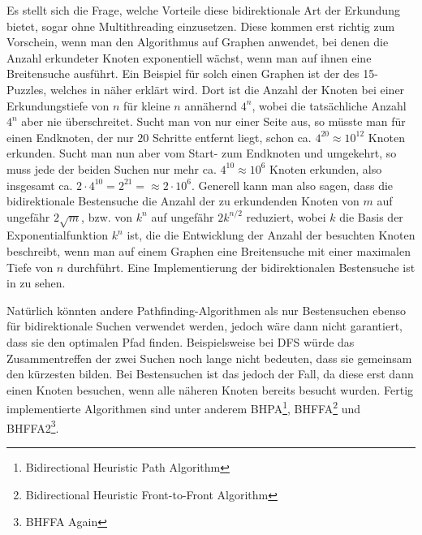             Es stellt sich die Frage, welche Vorteile diese bidirektionale Art der Erkundung bietet, sogar ohne Multithreading einzusetzen. Diese kommen erst richtig zum Vorschein, wenn man den Algorithmus auf Graphen anwendet, bei denen die Anzahl erkundeter Knoten exponentiell wächst, wenn man auf ihnen eine Breitensuche ausführt. Ein Beispiel für solch einen Graphen ist der des 15-Puzzles, welches in  näher erklärt wird. Dort ist die Anzahl der Knoten bei einer Erkundungstiefe von $n$ für kleine $n$ annähernd $4^n$, wobei die tatsächliche Anzahl $4^n$ aber nie überschreitet. Sucht man von nur einer Seite aus, so müsste man für einen Endknoten, der nur $20$ Schritte entfernt liegt, schon ca. $4^{20} \approx 10^{12}$ Knoten erkunden. Sucht man nun aber vom Start- zum Endknoten und umgekehrt, so muss jede der beiden Suchen nur mehr ca. $4^{10} \approx 10^6$ Knoten erkunden, also insgesamt ca. $2 \cdot 4^{10} = 2^{21} = \approx 2 \cdot 10^6$. Generell kann man also sagen, dass die bidirektionale Bestensuche die Anzahl der zu erkundenden Knoten von $m$ auf ungefähr $2 \sqrt{m}$, bzw. von $k^n$ auf ungefähr $2k^{n/2}$ reduziert, wobei $k$ die Basis der Exponentialfunktion $k^n$ ist, die die Entwicklung der Anzahl der besuchten Knoten beschreibt, wenn man auf einem Graphen eine Breitensuche mit einer maximalen Tiefe von $n$ durchführt. Eine Implementierung der bidirektionalen Bestensuche ist in  zu sehen.

            Natürlich könnten andere Pathfinding-Algorithmen als nur Bestensuchen ebenso für bidirektionale Suchen verwendet werden, jedoch wäre dann nicht garantiert, dass sie den optimalen Pfad finden. Beispielsweise bei DFS würde das Zusammentreffen der zwei Suchen noch lange nicht bedeuten, dass sie gemeinsam den kürzesten bilden. Bei Bestensuchen ist das jedoch der Fall, da diese erst dann einen Knoten besuchen, wenn alle näheren Knoten bereits besucht wurden. Fertig implementierte Algorithmen sind unter anderem BHPA\footnote{Bidirectional Heuristic Path Algorithm}, BHFFA\footnote{Bidirectional Heuristic Front-to-Front Algorithm} und BHFFA2\footnote{BHFFA Again}. \cite{EZ:Web58, EZ:Web62, EZ:Web63, EZ:Web64}

            

